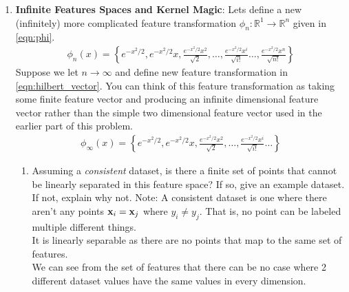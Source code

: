 \begin{enumerate}
\begin{enumerate}
  \end{enumerate}
  
\item \textbf{Infinite Features Spaces and Kernel Magic}: Lets define
  a new (infinitely) more complicated feature transformation
  $\phi_n:\mathbb{R}^1 \rightarrow \mathbb{R}^n$ given in
  \autoref{eqn:phi}.
  \begin{eqnarray}
    \phi_n(x) = \left\{ e^{-x^2/2}, e^{-x^2/2} x, \frac{e^{-x^2/2}x^2}{\sqrt{2}},
    \ldots,
    \frac{e^{-x^2/2}x^i}{\sqrt{i!}}
    \ldots,
    \frac{e^{-x^2/2}x^n}{\sqrt{n!}}
    \right\}
    \label{eqn:phi}
  \end{eqnarray}
  Suppose we let $n \rightarrow \infty$ and define new feature
  transformation in \autoref{eqn:hilbert_vector}.  You can think of
  this feature transformation as taking some finite feature vector and
  producing an infinite dimensional feature vector rather than the
  simple two dimensional feature vector used in the earlier part of
  this problem.
  \begin{eqnarray}
    \phi_{\infty}(x) = \left\{ e^{-x^2/2}, e^{-x^2/2} x,
    \frac{e^{-x^2/2}x^2}{\sqrt{2}},
    \ldots,
    \frac{e^{-x^2/2}x^i}{\sqrt{i!}}
    \ldots
    \right\}
    \label{eqn:hilbert_vector}
  \end{eqnarray}
  
  \begin{enumerate}
  \item {} Assuming a \emph{consistent} dataset, is there a
    finite set of points that cannot be linearly separated in this
    feature space?  If so, give an example dataset.  If not, explain
    why not.  Note: A consistent dataset is one where there aren't any
    points $\mathbf{x}_i = \mathbf{x}_j$ where $y_i \ne y_j$.  That is, no point can
    be labeled multiple different things. \\
  It is linearly separable as there are no points that map to the same set of features. \\
 We can see from the set of features that there can be no case where 2 different dataset values have the same values in every dimension.\\	


\end{enumerate}
\end{enumerate}
